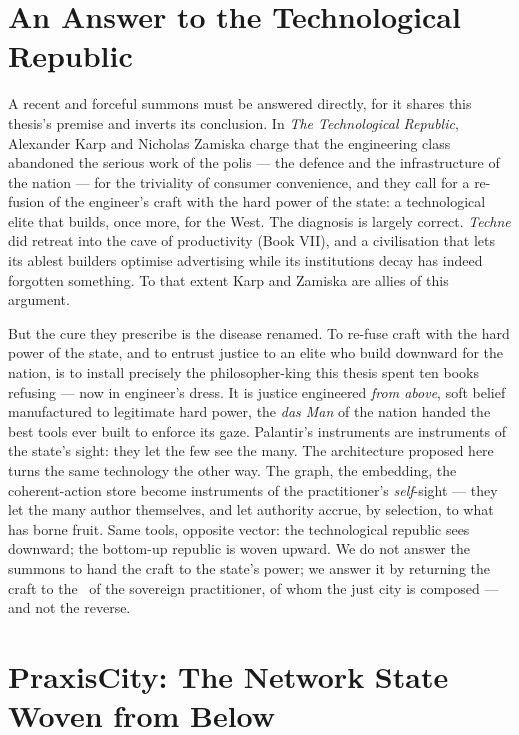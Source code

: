\section*{An Answer to the Technological Republic}

A recent and forceful summons must be answered directly, for it shares this
thesis's premise and inverts its conclusion. In \emph{The Technological Republic},
Alexander Karp and Nicholas Zamiska charge that the engineering class abandoned the
serious work of the polis --- the defence and the infrastructure of the nation ---
for the triviality of consumer convenience, and they call for a re-fusion of the
engineer's craft with the hard power of the state: a technological elite that
builds, once more, for the West. The diagnosis is largely correct. \emph{Techne}
did retreat into the cave of productivity (Book VII), and a civilisation that lets
its ablest builders optimise advertising while its institutions decay has indeed
forgotten something. To that extent Karp and Zamiska are allies of this argument.

But the cure they prescribe is the disease renamed. To re-fuse craft with the hard
power of the state, and to entrust justice to an elite who build downward for the
nation, is to install precisely the philosopher-king this thesis spent ten books
refusing --- now in engineer's dress. It is justice engineered \emph{from above},
soft belief manufactured to legitimate hard power, the \emph{das Man} of the nation
handed the best tools ever built to enforce its gaze. Palantir's instruments are
instruments of the state's sight: they let the few see the many. The architecture
proposed here turns the same technology the other way. The graph, the embedding,
the coherent-action store become instruments of the practitioner's \emph{self}-sight
--- they let the many author themselves, and let authority accrue, by selection, to
what has borne fruit. Same tools, opposite vector: the technological republic sees
downward; the bottom-up republic is woven upward. We do not answer the summons to
hand the craft to the state's power; we answer it by returning the craft to the
\physis\ of the sovereign practitioner, of whom the just city is composed --- and
not the reverse.

\section*{PraxisCity: The Network State Woven from Below}

